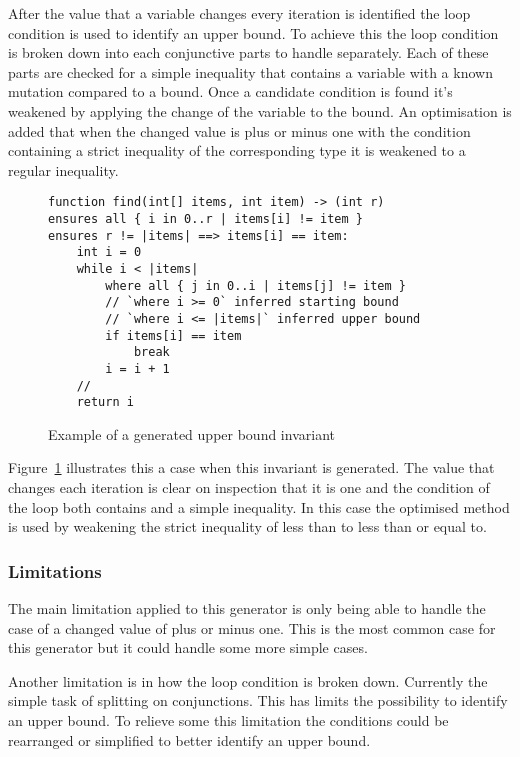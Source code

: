 After the value that a variable changes every iteration is identified the loop
condition is used to identify an upper bound.
To achieve this the loop condition is broken down into each conjunctive parts to handle
separately.
Each of these parts are checked for a simple inequality that contains a variable
with a known mutation compared to a bound.
Once a candidate condition is found it's weakened by applying the change of the variable
to the bound.
An optimisation is added that when the changed value is plus or minus one with the condition containing
a strict inequality of the corresponding type it is weakened to a regular inequality.

\begin{figure}
\begin{lstlisting}
function find(int[] items, int item) -> (int r)
ensures all { i in 0..r | items[i] != item }
ensures r != |items| ==> items[i] == item:
	int i = 0
	while i < |items|
		where all { j in 0..i | items[j] != item }
		// `where i >= 0` inferred starting bound
		// `where i <= |items|` inferred upper bound
		if items[i] == item
			break
		i = i + 1
	//
	return i
\end{lstlisting}
\caption{Example of a generated upper bound invariant}
\label{lst:whiley-upper-bound}
\end{figure}

Figure~\ref{lst:whiley-upper-bound} illustrates this a case when this invariant is generated.
The value that  changes each iteration is clear on inspection that it is one and
the condition of the loop both contains  and a simple inequality.
In this case the optimised method is used by weakening the strict inequality of less than to
less than or equal to.

\subsubsection{Limitations}

The main limitation applied to this generator is only being able to 
handle the case of a changed value of plus or minus one.
This is the most common case for this generator but it could handle
some more simple cases.

Another limitation is in how the loop condition is broken down.
Currently the simple task of splitting on conjunctions.
This has limits the possibility to identify an upper bound.
To relieve some this limitation the conditions could
be rearranged or simplified to better identify an upper bound. 

